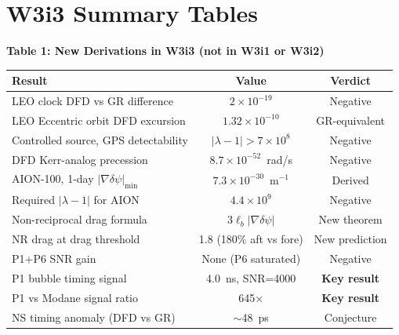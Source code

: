 \documentclass[11pt,twocolumn]{article}
\newcommand{\dpsi}{\delta\psi}
\newcommand{\lam}{\lambda}
\begin{document}
\section*{W3i3 Summary Tables}

\begin{center}
\textbf{Table 1: New Derivations in W3i3 (not in W3i1 or W3i2)}
\vspace{0.5em}

\begin{tabular}{@{}p{5cm}cc@{}}
\toprule
\textbf{Result} & \textbf{Value} & \textbf{Verdict} \\
\midrule
LEO clock DFD vs GR difference & $2\times10^{-19}$ & Negative \\
LEO Eccentric orbit DFD excursion & $1.32\times10^{-10}$ & GR-equivalent \\
Controlled source, GPS detectability & $|\lam-1| > 7\times10^8$ & Negative \\
DFD Kerr-analog precession & $8.7\times10^{-52}$~rad/s & Negative \\
AION-100, 1-day $|\nabla\dpsi|_{\min}$ & $7.3\times10^{-30}$~m$^{-1}$ & Derived \\
Required $|\lam-1|$ for AION & $4.4\times10^9$ & Negative \\
Non-reciprocal drag formula & $3\ell_b|\nabla\dpsi|$ & New theorem \\
NR drag at drag threshold & 1.8 (180\% aft vs fore) & New prediction \\
P1+P6 SNR gain & None (P6 saturated) & Negative \\
P1 bubble timing signal & 4.0~ns, SNR=4000 & \textbf{Key result} \\
P1 vs Modane signal ratio & 645$\times$ & \textbf{Key result} \\
NS timing anomaly (DFD vs GR) & $\sim$48~ps & Conjecture \\
\bottomrule
\end{tabular}
\end{center}

\vspace{0.8em}
\end{document}
